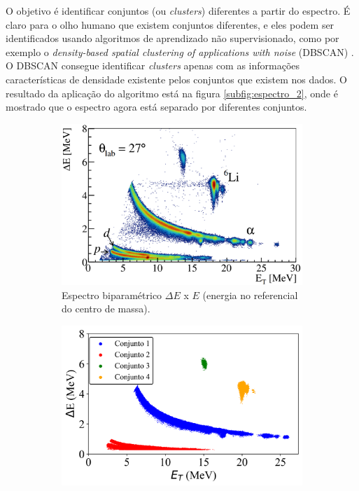 \documentclass[a4paper,12pt,oneside]{book}
\begin{document}
\begin{appendices}
\par O objetivo é identificar conjuntos (ou \textit{clusters}) diferentes a partir do espectro. É claro para o olho humano que existem conjuntos diferentes, e eles podem ser identificados usando algoritmos de aprendizado não supervisionado, como por exemplo o \textit{density-based spatial clustering of applications with noise} (DBSCAN) \cite{dbscan}. O DBSCAN consegue identificar \textit{clusters} apenas com as informações características de densidade existente pelos conjuntos que existem nos dados. O resultado da aplicação do algoritmo está na figura \ref{subfig:espectro_2}, onde é mostrado que o espectro agora está separado por diferentes conjuntos.

\begin{figure}[H]
\centering
    \begin{subfigure}[t]{0.48\textwidth}
        \centering
        \includegraphics[scale=0.21]{figs/espectro_1.png}
        \caption{Espectro biparamétrico $\Delta E$ x $E$ (energia no referencial do centro de massa).}
        \label{subfig:espectro_1}
    \end{subfigure}%
    \hfill
    \begin{subfigure}[t]{0.48\textwidth}
        \centering
        \includegraphics[scale=0.52]{figs/espectro_2.png}

\end{subfigure}
\end{figure}
\end{appendices}
\end{document}
